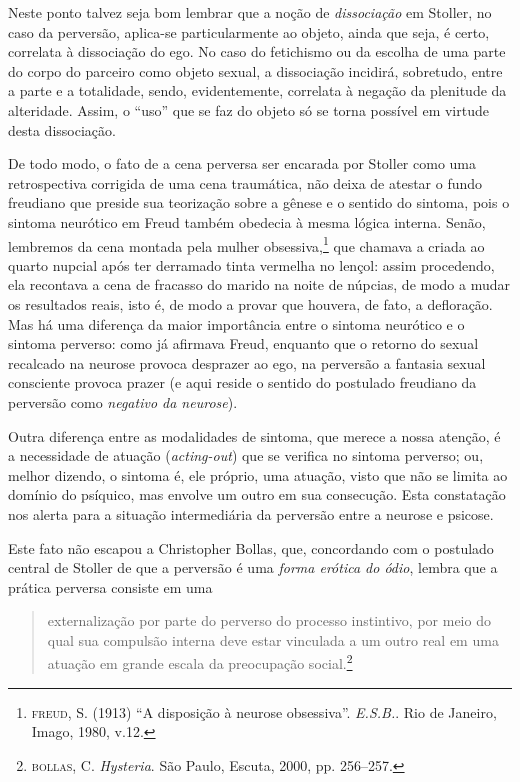 Neste ponto talvez seja bom lembrar que a noção de \emph{dissociação} em
Stoller, no caso da perversão, aplica-se particularmente ao objeto,
ainda que seja, é certo, correlata à dissociação do ego. No caso do
fetichismo ou da escolha de uma parte do corpo do parceiro como objeto
sexual, a dissociação incidirá, sobretudo, entre a parte e a totalidade,
sendo, evidentemente, correlata à negação da plenitude da alteridade.
Assim, o ``uso'' que se faz do objeto só se torna possível em virtude
desta dissociação.

De todo modo, o fato de a cena perversa ser encarada por Stoller como
uma retrospectiva corrigida de uma cena traumática, não deixa de atestar
o fundo freudiano que preside sua teorização sobre a gênese e o sentido
do sintoma, pois o sintoma neurótico em Freud também obedecia à mesma
lógica interna. Senão, lembremos da cena montada pela mulher
obsessiva,\footnote{\textsc{freud}, S. (1913) ``A disposição à neurose
  obsessiva''. \emph{E.S.B.}. Rio de Janeiro, Imago, 1980, v.12.} que
chamava a criada ao quarto nupcial após ter derramado tinta vermelha no
lençol: assim procedendo, ela recontava a cena de fracasso do marido na
noite de núpcias, de modo a mudar os resultados reais, isto é, de modo a
provar que houvera, de fato, a defloração. Mas há uma diferença da maior
importância entre o sintoma neurótico e o sintoma perverso: como já
afirmava Freud, enquanto que o retorno do sexual recalcado na neurose
provoca desprazer ao ego, na perversão a fantasia sexual consciente
provoca prazer (e aqui reside o sentido do postulado freudiano da
perversão como \emph{negativo da neurose}).

Outra diferença entre as modalidades de sintoma, que merece a nossa
atenção, é a necessidade de atuação (\emph{acting-out}) que se verifica
no sintoma perverso; ou, melhor dizendo, o sintoma é, ele próprio, uma
atuação, visto que não se limita ao domínio do psíquico, mas envolve um
outro em sua consecução. Esta constatação nos alerta para a situação
intermediária da perversão entre a neurose e psicose.

Este fato não escapou a Christopher Bollas, que, concordando com o
postulado central de Stoller de que a perversão é uma \emph{forma
erótica do ódio}, lembra que a prática perversa consiste em uma

\begin{quote}
externalização por parte do perverso do processo instintivo, por meio do
qual sua compulsão interna deve estar vinculada a um outro real em uma
atuação em grande escala da preocupação social.\footnote{\textsc{bollas},
  C. \emph{Hysteria}. São Paulo, Escuta, 2000, pp. 256--257.}
\end{quote}

